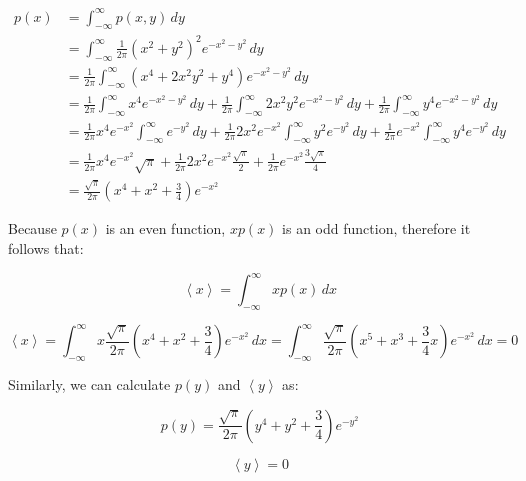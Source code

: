 \documentclass{article}
\begin{document}
\begin{equation*}    
    \begin{aligned}
p(x) &=  \int _{-\infty }^{\infty } p(x,y) \,dy \\
&= \int _{-\infty }^{\infty } \frac{1}{2\pi} (x^2+y^2)^2  e^{-x^2-y^2} \,dy \\
&= \frac{1}{2\pi} \int _{-\infty }^{\infty } (x^4+2x^2y^2 + y^4)  e^{-x^2-y^2} \,dy \\
&= \frac{1}{2\pi} \int _{-\infty }^{\infty } x^4  e^{-x^2-y^2} \,dy +
   \frac{1}{2\pi} \int _{-\infty }^{\infty } 2x^2y^2 e^{-x^2-y^2} \,dy +
   \frac{1}{2\pi} \int _{-\infty }^{\infty } y^4 e^{-x^2-y^2} \,dy 
\\
&= \frac{1}{2\pi} x^4  e^{-x^2} \int _{-\infty }^{\infty } e^{-y^2} \,dy +
   \frac{1}{2\pi} 2x^2 e^{-x^2} \int _{-\infty }^{\infty } y^2 e^{-y^2} \,dy +
   \frac{1}{2\pi} e^{-x^2} \int _{-\infty }^{\infty } y^4 e^{-y^2} \,dy 
\\
&= \frac{1}{2\pi} x^4  e^{-x^2} \sqrt{\pi} +
   \frac{1}{2\pi} 2x^2 e^{-x^2} \frac{\sqrt{\pi}}{2} +
   \frac{1}{2\pi} e^{-x^2} \frac{3\sqrt{\pi}}{4}
\\
&= \frac{\sqrt{\pi}}{2\pi} (x^4+x^2 +\frac{3}{4} ) e^{-x^2}  
    \end{aligned}
\end{equation*}




Because $p(x)$ is an even function, $xp(x)$ is an odd function, therefore it follows that:

\begin{equation*}    
\left\langle x \right\rangle =  \int _{-\infty }^{\infty } x p(x) \,dx 
\end{equation*}

\[
\left\langle x \right\rangle =  \int _{-\infty }^{\infty } x \frac{\sqrt{\pi}}{2\pi} (x^4+x^2 +\frac{3}{4} ) e^{-x^2}  \,dx 
=   \int _{-\infty }^{\infty }  \frac{\sqrt{\pi}}{2\pi} (x^5+x^3 +\frac{3}{4}x ) e^{-x^2}  \,dx = 0 
\]

Similarly, we can calculate $p(y)$ and $\left\langle y \right\rangle$ as: 

\begin{equation*}    
p(y) =  \frac{\sqrt{\pi}}{2\pi} (y^4+y^2 +\frac{3}{4} ) e^{-y^2} 
\end{equation*}

\begin{equation*}    
\left\langle y \right\rangle =  0
\end{equation*}
\end{document}
